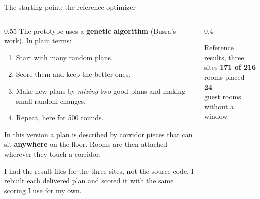 \documentclass[9pt,aspectratio=169]{beamer}
\newcommand{\bignum}[2]{{\color{#1}\fontsize{30}{32}\selectfont\bfseries #2}}
\begin{document}
\begin{frame}{The starting point: the reference optimizer}
\begin{columns}[T]
\begin{column}{0.55\textwidth}
The prototype uses a \textbf{genetic algorithm} (Busra's work). In plain terms:
\begin{enumerate}
\item Start with many random plans.
\item Score them and keep the better ones.
\item Make new plans by \emph{mixing} two good plans and making small random changes.
\item Repeat, here for 500 rounds.
\end{enumerate}
In this version a plan is described by corridor pieces that can sit \textbf{anywhere} on the floor. Rooms are then attached wherever they touch a corridor.

{\small\color{muted} I had the result files for the three sites, not the source code. I rebuilt each delivered plan and scored it with the same scoring I use for my own.}
\end{column}
\begin{column}{0.4\textwidth}
\begin{block}{Reference results, three sites}
\centering
\bignum{blueprintdeep}{171 of 216}\\ rooms placed\\[0.5cm]
\bignum{critical}{24}\\ guest rooms without a window
\end{block}
\end{column}
\end{columns}
\end{frame}
\end{document}

